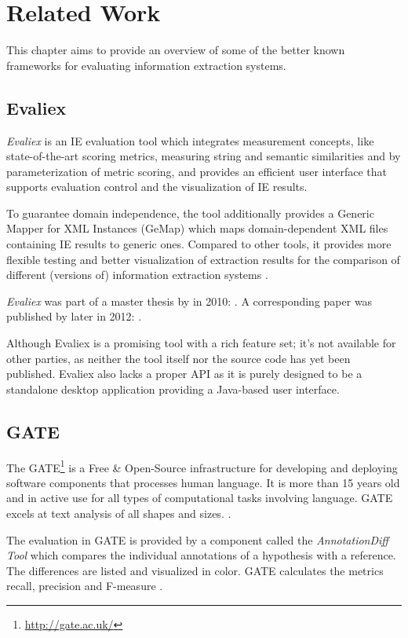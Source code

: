 \section{Related Work}
\label{sec:related-work}
This chapter aims to provide an overview of some of the better known frameworks for evaluating information extraction systems.

\subsection{Evaliex}
\textit{Evaliex} is an \gls{IE} evaluation tool which integrates measurement concepts, like state-of-the-art scoring metrics, measuring string and semantic similarities and by parameterization of metric scoring, and provides an efficient user interface that supports evaluation control and the visualization of \gls{IE} results.

To guarantee domain independence, the tool additionally provides a Generic Mapper for XML Instances (GeMap) which maps domain-dependent XML files containing \gls{IE} results to generic ones. Compared to other tools, it provides more flexible testing and better visualization of extraction results for the comparison of different (versions of) information extraction systems \cite{Feilmayr:2012}.

\textit{Evaliex}  was part of a master thesis by \citeauthor{Linsmayr:2010} in 2010:  \cite{Linsmayr:2010}. A corresponding paper was published by \citeauthor{Feilmayr:2012} later in 2012:  \cite{Feilmayr:2012}.

Although Evaliex is a promising tool with a rich feature set; it's not available for other parties, as neither the tool itself nor the source code has yet been published. Evaliex also lacks a proper \gls{API} as it is purely designed to be a standalone desktop application providing a Java-based user interface.

\subsection{GATE}
The \gls{GATE}\footnote{\url{http://gate.ac.uk/}} is a Free \& Open-Source infrastructure for developing and deploying software components that processes human language. It is more than 15 years old and in active use for all types of computational tasks involving language. GATE excels at text analysis of all shapes and sizes. \cite{Cunningham:2011}.

The evaluation in GATE is provided by a component called the \textit{AnnotationDiff Tool} which compares the individual annotations of a hypothesis with a reference. The differences are listed and visualized in color. GATE calculates the metrics recall, precision and F-measure \cite{Linsmayr:2010}.


